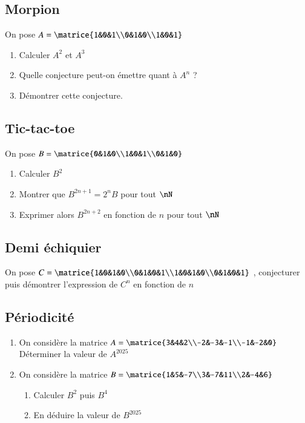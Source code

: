 \documentclass[oneside,12pt]{article}          %
\begin{document}
\subsection{Morpion}
On pose $A=\matrice{1&0&1\\0&1&0\\1&0&1} $
    \begin{enumerate}
        \item Calculer $A^2$ et $A^3$
        \item Quelle conjecture peut-on émettre quant à $A^n$ ?
        \item Démontrer cette conjecture.
    \end{enumerate}



\subsection{Tic-tac-toe}
On pose $B=\matrice{0&1&0\\1&0&1\\0&1&0} $
    \begin{enumerate}
        \item Calculer $B^2$
        \item Montrer que $B^{2n+1}=2^nB$ pour tout $\nN$
        \item Exprimer alors $B^{2n+2}$ en fonction de $n$ pour tout $\nN$
    \end{enumerate}



\subsection{Demi échiquier}

On pose $C=\matrice{1&0&1&0\\0&1&0&1\\1&0&1&0\\0&1&0&1} $ , conjecturer puis démontrer l'expression de $C^n$ en fonction de $n$



\subsection{Périodicité}
\begin{enumerate}
    \item On considère la matrice $A=\matrice{3&4&2\\-2&-3&-1\\-1&-2&0} $ \\
    Déterminer la valeur de $A^{2025}$
    \item On considère la matrice $B=\matrice{1&5&-7\\3&-7&11\\2&-4&6}$ 
    \begin{enumerate}
    	\item Calculer $B^2$ puis $B^4$
    	\item En déduire la valeur de $B^{2025}$
    \end{enumerate}
    
\end{enumerate}
\end{document}
